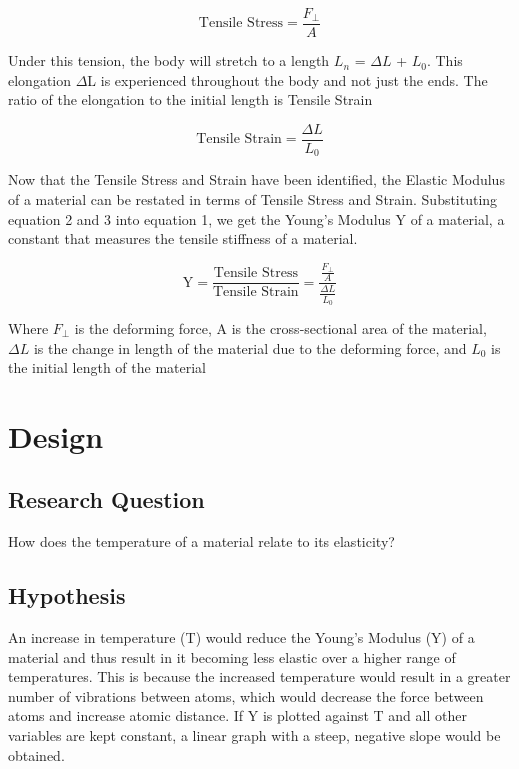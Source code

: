 \documentclass{article}
\begin{document}
\begin{equation}
    \text{Tensile~Stress} = \frac{F_{\bot}}{A}
    \end{equation} 

\par{Under this tension, the body will stretch to a length $L_n$ = $\Delta L$ + $L_0$. This elongation $\Delta$L is experienced throughout the body and not just the ends. The ratio of the elongation to the initial length is Tensile Strain}

\begin{equation}
    \text{Tensile~Strain} = \frac{\Delta L}{L_0}
\end{equation} 

\par{Now that the Tensile Stress and Strain have been identified, the Elastic Modulus of a material can be restated in terms of Tensile Stress and Strain. Substituting equation 2 and 3 into equation 1, we get the Young's Modulus Y of a material, a constant that measures the tensile stiffness of a material.}

\begin{equation}
    \text{Y} = \frac{\text{Tensile~Stress}}{\text{Tensile~Strain}} = \frac{\frac{F_{\bot}}{A}}{\frac{\Delta L}{L_0}}
\end{equation} 

\par{Where $F_{\bot}$ is the deforming force, A is the cross-sectional area of the material, $\Delta L$ is the change in length of the material due to the deforming force, and $L_0$ is the initial length of the material \newline

}
\section{Design}

\subsection{Research Question}

\par{How does the temperature of a material relate to its elasticity?}

\subsection{Hypothesis}

\par{An increase in temperature (T) would reduce the Young's Modulus (Y) of a material and thus result in it becoming less elastic over a higher range of temperatures. This is because the increased temperature would result in a greater number of vibrations between atoms, which would decrease the force between atoms and increase atomic distance. If Y is plotted against T and all other variables are kept constant, a linear graph with a steep, negative slope would be obtained.}
\vspace{-0.5cm}
\end{document}
